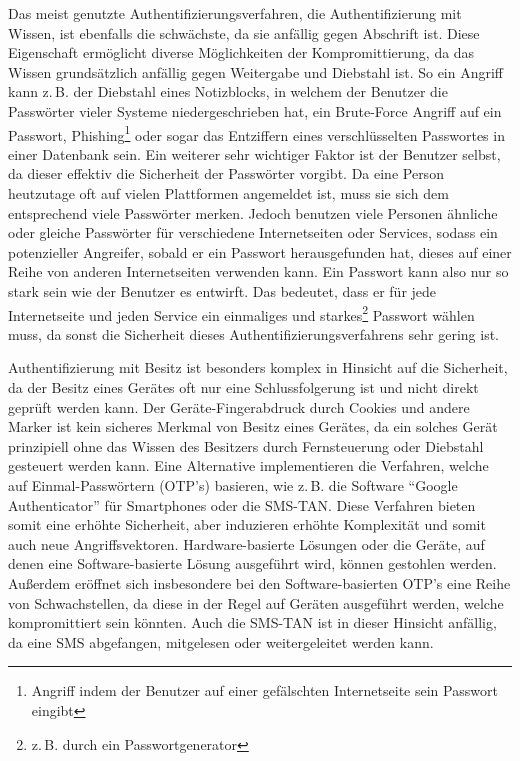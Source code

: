 \documentclass[11pt,a4paper,ngerman]{scrreprt}
\begin{document}
\begin{description}[font=\rmfamily]
    \item[Wissen] Das meist genutzte Authentifizierungsverfahren, die Authentifizierung mit Wissen, ist ebenfalls die schwächste, da sie anfällig gegen Abschrift ist. Diese Eigenschaft ermöglicht diverse Möglichkeiten der Kompromittierung, da das Wissen grundsätzlich anfällig gegen Weitergabe und Diebstahl ist. So ein Angriff kann z.\,B. der Diebstahl eines Notizblocks, in welchem der Benutzer die Passwörter vieler Systeme niedergeschrieben hat, ein Brute-Force Angriff auf ein Passwort, Phishing\footnote{Angriff indem der Benutzer auf einer gefälschten Internetseite sein Passwort eingibt} oder sogar das Entziffern eines verschlüsselten Passwortes in einer Datenbank sein. Ein weiterer sehr wichtiger Faktor ist der Benutzer selbst, da dieser effektiv die Sicherheit der Passwörter vorgibt. Da eine Person heutzutage oft auf vielen Plattformen angemeldet ist, muss sie sich dem entsprechend viele Passwörter merken. Jedoch benutzen viele Personen ähnliche oder gleiche Passwörter für verschiedene Internetseiten oder Services, sodass ein potenzieller Angreifer, sobald er ein Passwort herausgefunden hat, dieses auf einer Reihe von anderen Internetseiten verwenden kann. Ein Passwort kann also nur so stark sein wie der Benutzer es entwirft. Das bedeutet, dass er für jede Internetseite und jeden Service ein einmaliges und starkes\footnote{z.\,B. durch ein Passwortgenerator} Passwort wählen muss, da sonst die Sicherheit dieses Authentifizierungsverfahrens sehr gering ist.
    \item[Besitz] Authentifizierung mit Besitz ist besonders komplex in Hinsicht auf die Sicherheit, da der Besitz eines Gerätes oft nur eine Schlussfolgerung ist und nicht direkt geprüft werden kann. Der Geräte-Fingerabdruck durch Cookies und andere Marker ist kein sicheres Merkmal von Besitz eines Gerätes, da ein solches Gerät prinzipiell ohne das Wissen des Besitzers durch Fernsteuerung oder Diebstahl gesteuert werden kann. Eine Alternative implementieren die Verfahren, welche auf Einmal-Passwörtern (OTP's) basieren, wie z.\,B. die Software ``Google Authenticator'' für Smartphones oder die SMS-TAN. Diese Verfahren bieten somit eine erhöhte Sicherheit, aber induzieren erhöhte Komplexität und somit auch neue Angriffsvektoren. Hardware-basierte Lösungen oder die Geräte, auf denen eine Software-basierte Lösung ausgeführt wird, können gestohlen werden. Außerdem eröffnet sich insbesondere bei den Software-basierten OTP's eine Reihe von Schwachstellen, da diese in der Regel auf Geräten ausgeführt werden, welche kompromittiert sein könnten. Auch die SMS-TAN ist in dieser Hinsicht anfällig, da eine SMS abgefangen, mitgelesen oder weitergeleitet werden kann.

\end{description}
\end{document}
